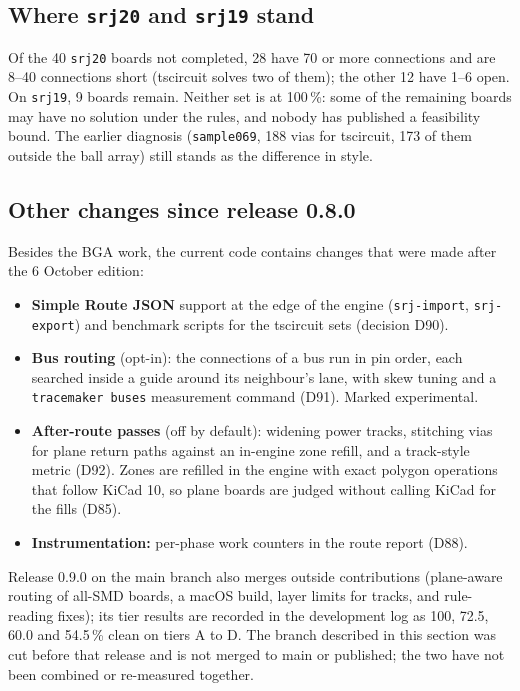 \documentclass[10pt,a4paper]{article}
\begin{document}
\subsection{Where \texttt{srj20} and \texttt{srj19} stand}

Of the 40 \texttt{srj20} boards not completed, 28 have 70 or more connections and are 8--40 connections short (tscircuit solves two of them); the
other 12 have 1--6 open. On \texttt{srj19}, 9 boards remain. Neither set is at 100\,\%: some of the remaining boards may have no solution under the
rules, and nobody has published a feasibility bound.
The earlier diagnosis (\texttt{sample069}, 188 vias for tscircuit, 173 of them outside the ball array) still stands as the difference in style.

\subsection{Other changes since release 0.8.0}

Besides the BGA work, the current code contains changes that were made after the 6 October edition:
\begin{itemize}[leftmargin=*]
  \item \textbf{Simple Route JSON} support at the edge of the engine (\texttt{srj-import}, \texttt{srj-export}) and
  benchmark scripts for the tscircuit sets (decision D90).
  \item \textbf{Bus routing} (opt-in): the connections of a bus run in pin order, each searched inside a guide around its
  neighbour's lane, with skew tuning and a \texttt{tracemaker buses} measurement command (D91). Marked experimental.
  \item \textbf{After-route passes} (off by default): widening power tracks, stitching vias for plane return paths against an
  in-engine zone refill, and a track-style metric (D92). Zones are refilled in the engine with exact polygon operations
  that follow KiCad 10, so plane boards are judged without calling KiCad for the fills (D85).
  \item \textbf{Instrumentation:} per-phase work counters in the route report (D88).
\end{itemize}
Release 0.9.0 on the main branch also merges outside contributions (plane-aware routing of all-SMD boards, a macOS
build, layer limits for tracks, and rule-reading fixes); its tier results are recorded in the development log as
100, 72.5, 60.0 and 54.5\,\% clean on tiers A to D. The branch described in this section was cut before that release and is not
merged to main or published; the two have not been combined or re-measured together.
\end{document}
